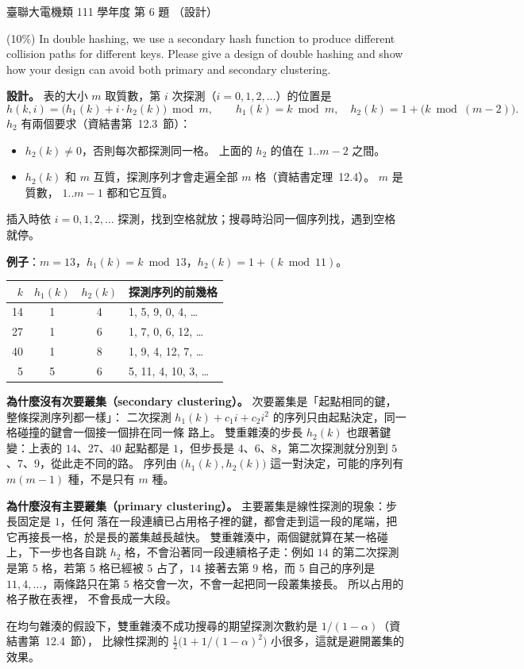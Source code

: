\begin{pastexam}[label={px:ust-111-ee-ds-06}]{臺聯大電機類 111 學年度 第 6 題}
（設計）

(10\%) In double hashing, we use a secondary hash function to produce different collision paths for
different keys. Please give a design of double hashing and show how your design can avoid both
primary and secondary clustering.
\end{pastexam}

\begin{pastsoln}
\textbf{設計。} 表的大小 $m$ 取質數，第 $i$ 次探測（$i = 0, 1, 2, \dots$）的位置是
\[
h(k, i) = \bigl(h_1(k) + i \cdot h_2(k)\bigr) \bmod m, \qquad
h_1(k) = k \bmod m, \quad h_2(k) = 1 + \bigl(k \bmod (m - 2)\bigr).
\]
$h_2$ 有兩個要求（資結書第~12.3~節）：
\begin{itemize}
\item $h_2(k) \ne 0$，否則每次都探測同一格。 上面的 $h_2$ 的值在 $1..m-2$ 之間。
\item $h_2(k)$ 和 $m$ 互質，探測序列才會走遍全部 $m$ 格（資結書定理~12.4）。 $m$ 是質數，
$1..m-1$ 都和它互質。
\end{itemize}
插入時依 $i = 0, 1, 2, \dots$ 探測，找到空格就放；搜尋時沿同一個序列找，遇到空格就停。

\textbf{例子}：$m = 13$，$h_1(k) = k \bmod 13$，$h_2(k) = 1 + (k \bmod 11)$。
\begin{center}
\small
\begin{tabular}{rccl}
\toprule
$k$ & $h_1(k)$ & $h_2(k)$ & 探測序列的前幾格 \\
\midrule
14 & 1 & 4 & 1, 5, 9, 0, 4, \dots \\
27 & 1 & 6 & 1, 7, 0, 6, 12, \dots \\
40 & 1 & 8 & 1, 9, 4, 12, 7, \dots \\
5 & 5 & 6 & 5, 11, 4, 10, 3, \dots \\
\bottomrule
\end{tabular}
\end{center}

\textbf{為什麼沒有次要叢集（secondary clustering）。} 次要叢集是「起點相同的鍵，整條探測序列都一樣」：
二次探測 $h_1(k) + c_1 i + c_2 i^2$ 的序列只由起點決定，同一格碰撞的鍵會一個接一個排在同一條
路上。 雙重雜湊的步長 $h_2(k)$ 也跟著鍵變：上表的 $14$、$27$、$40$ 起點都是 $1$，但步長是
$4$、$6$、$8$，第二次探測就分別到 $5$、$7$、$9$，從此走不同的路。 序列由 $\bigl(h_1(k), h_2(k)\bigr)$
這一對決定，可能的序列有 $m(m-1)$ 種，不是只有 $m$ 種。

\textbf{為什麼沒有主要叢集（primary clustering）。} 主要叢集是線性探測的現象：步長固定是 $1$，任何
落在一段連續已占用格子裡的鍵，都會走到這一段的尾端，把它再接長一格，於是長的叢集越長越快。
雙重雜湊中，兩個鍵就算在某一格碰上，下一步也各自跳 $h_2$ 格，不會沿著同一段連續格子走：例如
$14$ 的第二次探測是第 $5$ 格，若第 $5$ 格已經被 $5$ 占了，$14$ 接著去第 $9$ 格，而 $5$ 自己的序列是
$11, 4, \dots$，兩條路只在第 $5$ 格交會一次，不會一起把同一段叢集接長。 所以占用的格子散在表裡，
不會長成一大段。

在均勻雜湊的假設下，雙重雜湊不成功搜尋的期望探測次數約是 $1/(1 - \alpha)$（資結書第~12.4~節），
比線性探測的 $\frac{1}{2}\bigl(1 + 1/(1-\alpha)^2\bigr)$ 小很多，這就是避開叢集的效果。
\end{pastsoln}
